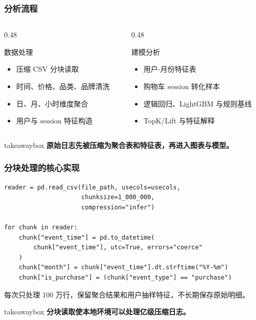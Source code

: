 \documentclass[aspectratio=169]{ctexbeamer}
\newcommand{\keytakeaway}[1]{%
  \vspace{0.10cm}
  \begin{beamercolorbox}[wd=\textwidth,sep=5pt]{takeawaybox}
    \small\textbf{#1}
  \end{beamercolorbox}
}
\begin{document}
\begin{frame}
  \frametitle{分析流程}
  \begin{columns}
    \begin{column}{0.48\textwidth}
      \begin{block}{数据处理}
      \begin{itemize}
        \item 压缩 CSV 分块读取
        \item 时间、价格、品类、品牌清洗
        \item 日、月、小时维度聚合
        \item 用户与 session 特征构造
      \end{itemize}
      \end{block}
    \end{column}
    \begin{column}{0.48\textwidth}
      \begin{block}{建模分析}
      \begin{itemize}
        \item 用户-月份特征表
        \item 购物车 session 转化样本
        \item 逻辑回归、LightGBM 与规则基线
        \item TopK/Lift 与特征解释
      \end{itemize}
      \end{block}
    \end{column}
  \end{columns}
  \keytakeaway{原始日志先被压缩为聚合表和特征表，再进入图表与模型。}
\end{frame}

\begin{frame}[fragile]
  \frametitle{分块处理的核心实现}
  \begin{lstlisting}
reader = pd.read_csv(file_path, usecols=usecols,
                     chunksize=1_000_000,
                     compression="infer")

for chunk in reader:
    chunk["event_time"] = pd.to_datetime(
        chunk["event_time"], utc=True, errors="coerce"
    )
    chunk["month"] = chunk["event_time"].dt.strftime("%Y-%m")
    chunk["is_purchase"] = (chunk["event_type"] == "purchase")
  \end{lstlisting}
  \vspace{0.2cm}
  每次只处理 100 万行，保留聚合结果和用户抽样特征，不长期保存原始明细。
  \keytakeaway{分块读取使本地环境可以处理亿级压缩日志。}
\end{frame}
\end{document}
